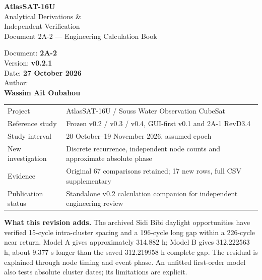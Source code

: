 \documentclass[10pt,a4paper]{article}
\numberwithin{equation}{section}
\begin{document}
\thispagestyle{plain}
\begin{mdframed}[backgroundcolor=atlasblue,linewidth=0pt,innertopmargin=20pt,innerbottommargin=20pt,innerleftmargin=20pt,innerrightmargin=20pt]
\begin{minipage}[c]{.66\linewidth}
{\fontsize{22}{26}\selectfont\bfseries\color{white}AtlasSAT-16U}\\[6pt]
{\fontsize{15}{19}\selectfont\color{white!85!atlasblue}Analytical Derivations \&\\Independent Verification}\\[5pt]
{\fontsize{10}{13}\selectfont\color{white!70!atlasblue}Document 2A-2 --- Engineering Calculation Book}
\end{minipage}\hfill
\begin{minipage}[c]{.29\linewidth}\raggedleft
{\fontsize{9}{12}\selectfont\color{white!75!atlasblue}
Document: \textbf{2A-2}\\Version: \textbf{v0.2.1}\\Date: \textbf{27 October 2026}\\[8pt]
Author:\\\textbf{Wassim Ait Oubahou}}
\end{minipage}
\end{mdframed}
\vspace{10pt}
\begin{tabularx}{\linewidth}{@{}lX@{}}
\toprule\rowcolor{headerbg}\multicolumn{2}{l}{\textbf{\textcolor{atlasblue}{Document information}}}\\\midrule
Project & AtlasSAT-16U / Souss Water Observation CubeSat\\
\rowcolor{rowalt}Reference study & Frozen v0.2 / v0.3 / v0.4, GUI-first v0.1 and 2A-1 RevD3.4\\
Study interval & 20 October--19 November 2026, assumed epoch\\
\rowcolor{rowalt}New investigation & Discrete recurrence, independent node counts and approximate absolute phase\\
Evidence & Original 67 comparisons retained; 17 new rows, full CSV supplementary\\
\rowcolor{rowalt}Publication status & Standalone v0.2 calculation companion for independent engineering review\\
\bottomrule
\end{tabularx}
\vspace{10pt}
\begin{infobox}
\textbf{\textcolor{atlasblue}{What this revision adds.}}
The archived Sidi Bibi daylight opportunities have verified 15-cycle intra-cluster spacing and a 196-cycle long gap within a 226-cycle near return. Model A gives approximately 314.882 h; Model B gives 312.222563 h, about 9.377 s longer than the saved 312.219958 h complete gap. The residual is explained through node timing and event phase. An unfitted first-order model also tests absolute cluster dates; its limitations are explicit.
\end{infobox}
\end{document}
